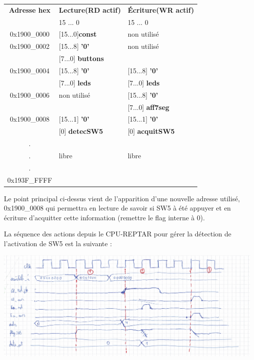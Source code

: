 \begin{center}
\begin{tabular}{|c|l|l|}
\hline
\textbf{Adresse hex} & \textbf{Lecture(RD actif)} & \textbf{Écriture(WR actif)} \\
			& 15    ...      0  & 15     ...      0  \\
\hline
\hline 
\hline
0x1900\_0000 & [15...0]\textbf{const} & non utilisé\\
\hline
0x1900\_0002 & [15...8] \textbf{'0'} & non utilisé\\
			 & [7...0] \textbf{buttons} & \\
\hline
0x1900\_0004 & [15...8] \textbf{'0'} & [15...8] \textbf{'0'}\\
			 & [7...0] \textbf{leds} & [7...0] \textbf{leds} \\
\hline
0x1900\_0006 & non utilisé & [15...8] \textbf{'0'}\\
			 &             & [7...0] \textbf{aff7seg} \\
\hline
0x1900\_0008 & [15...1] \textbf{'0'} & [15...1] \textbf{'0'}\\
			 & [0] \textbf{detecSW5} & [0] \textbf{acquitSW5} \\
\hline
. & & \\
.& libre & libre\\
. & &\\
0x193F\_FFFF & &\\ 
\hline
\end{tabular}
\end{center}\par
Le point principal ci-dessus vient de l'apparition d'une nouvelle adresse utilisé, 0x1900\_0008 qui permettra en lecture de savoir si SW5 à été appuyer et en écriture d'acquitter cette information (remettre le flag interne à 0).\\\par
La séquence des actions depuis le CPU-REPTAR pour gérer la détection de l'activation de SW5 est la suivante :
\begin{center}
\includegraphics[scale=0.1]{./images/partie2_Chronogramme.jpg}\\\par
{}
\end{center}\par
